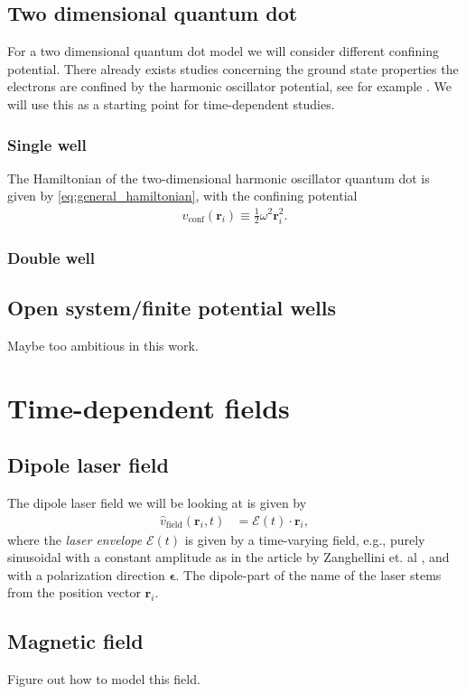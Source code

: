 \documentclass[aip,jcp,reprint,floatfix]{revtex4-1}
\renewcommand{\vec}[1]{\boldsymbol{#1}}
\newcommand{\vconf}{\hat{v}_{\text{conf}}}
\newcommand{\vfield}{\hat{v}_{\text{field}}}
\newcommand{\envelope}{\vec{\mathcal{E}}}
\newcommand{\polarization}{\vec{\epsilon}}
\begin{document}
    \subsection{Two dimensional quantum dot}
        For a two dimensional quantum dot model we will consider different confining potential. There already exists studies concerning the ground state properties the electrons are confined by the harmonic oscillator potential, see for example \cite{HjorthJensenQD_2017}. We will use this as a starting point for time-dependent studies.
    \subsubsection{Single well}
        The Hamiltonian of the two-dimensional harmonic oscillator quantum dot is given by \autoref{eq:general_hamiltonian}, with the confining potential
        \begin{align}
            \vconf(\boldsymbol{r}_i) \equiv \frac{1}{2} \omega^2 \boldsymbol{r}_i^2.
        \end{align}
    \subsubsection{Double well}
    \subsection{Open system/finite potential wells}
        Maybe too ambitious in this work.

\section{Time-dependent fields}
    \subsection{Dipole laser field}
        The dipole laser field we will be looking at is given by
        \begin{align}
            \vfield(\boldsymbol{r}_i, t)
            &= \envelope(t) \cdot \boldsymbol{r}_i,
        \end{align}
        where the \emph{laser envelope} $\envelope(t)$ is given by a time-varying field, e.g., purely sinusoidal with a constant amplitude as in the article by Zanghellini et. al \cite{Zanghellini04}, and with a polarization direction $\polarization$.
        The dipole-part of the name of the laser stems from the position vector $\vec{r}_i$.
    \subsection{Magnetic field}
        Figure out how to model this field.
        
\end{document}
